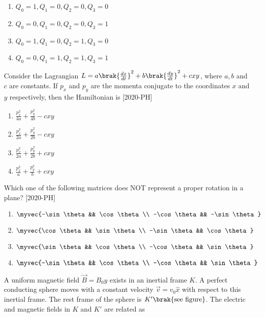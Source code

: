 \begin{enumerate}
    \item $Q_0=1, Q_1=0, Q_2=0, Q_3=0$
    \item $Q_0=0, Q_1=0, Q_2=0, Q_3=1$
    \item $Q_0=1, Q_1=0, Q_2=1, Q_3=0$
    \item $Q_0=0, Q_1=1, Q_2=1, Q_3=1$
\end{enumerate}
\item Consider the Lagrangian $L=a \brak{\frac{dx}{dt}}^2 + b \brak{\frac{dy}{dt}}^2 + cxy$, where $a, b$ and $c$ are constants. If $p_x$ and $p_y$ are the momenta conjugate to the coordinates $x$ and $y$ respectively, then the Hamiltonian is \hfill{[2020-PH]}\\
\begin{enumerate}
    \item $\frac{p_x ^2}{4a} + \frac{p_y ^2}{4b} - cxy$\\
    \item $\frac{p_x ^2}{2a} + \frac{p_y ^2}{2b} - cxy$\\
    \item $\frac{p_x ^2}{2a} + \frac{p_y ^2}{2b} + cxy$\\
    \item $\frac{p_x ^2}{a} + \frac{p_y ^2}{b} + cxy$\\
\end{enumerate}
\item Which one of the following matrices does NOT represent a proper rotation in a plane? \hfill{[2020-PH]}\\
\begin{enumerate}
    \item $\myvec{-\sin \theta && \cos \theta\\ -\cos \theta && -\sin \theta}$\\
    \item $\myvec{\cos \theta && \sin \theta\\ -\sin \theta && \cos \theta}$\\
    \item $\myvec{\sin \theta && \cos \theta\\ -\cos \theta && \sin \theta}$\\
    \item $\myvec{-\sin \theta && \cos \theta\\ -\cos \theta && \sin \theta}$\\
\end{enumerate}
\item A uniform magnetic field $\overrightarrow{B}=B_0 \hat{y}$ exists in an inertial frame $K$. A perfect conducting sphere moves with a constant velocity $\overrightarrow{v}=v_0 \hat{x}$ with respect to this inertial frame. The rest frame of the sphere is $K' \brak{\text{see figure}}$. The electric and magnetic fields in $K$ and $K'$ are related as \\

